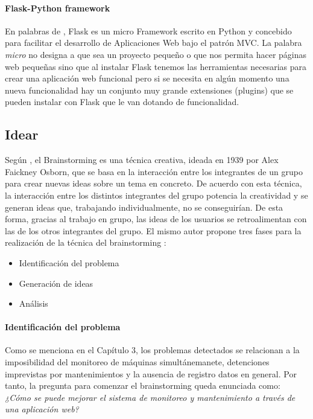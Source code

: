 \paragraph{Flask-Python framework} En palabras de \cite{munoz2017}, Flask es un micro Framework escrito en Python y concebido para facilitar el desarrollo de Aplicaciones Web bajo el patrón MVC. La palabra \textit{micro} no designa a que sea un proyecto pequeño o que nos permita hacer páginas web pequeñas sino que al instalar Flask tenemos las herramientas necesarias para crear una aplicación web funcional pero si se necesita en algún momento una nueva funcionalidad hay un conjunto muy grande extensiones (plugins) que se pueden instalar con Flask que le van dotando de funcionalidad. 

\subsection{Idear}

Según \citep{leis2020}, el Brainstorming es una técnica creativa, ideada en 1939 por Alex Faickney Osborn, que se basa en la interacción entre los integrantes de un grupo para crear nuevas ideas sobre un tema en concreto. De acuerdo con esta técnica, la interacción entre los distintos integrantes del grupo potencia la creatividad y se generan ideas que, trabajando individualmente, no se conseguirían. De esta forma, gracias al trabajo en grupo, las ideas de los usuarios se retroalimentan con las de los otros integrantes del grupo.
El mismo autor propone tres fases para la realización de la técnica del brainstorming \citep{leis2020}:

\begin{itemize}
\item Identificación del problema
\item Generación de ideas
\item Análisis
\end{itemize}

\paragraph{Identificación del problema} Como se menciona en el Capítulo 3, los problemas detectados se relacionan a la imposibilidad del monitoreo de máquinas simultánemanete, detenciones imprevistas por mantenimientos y la ausencia de registro datos en general. Por tanto, la pregunta para comenzar el brainstorming queda enunciada como: \textit{¿Cómo se puede mejorar el sistema de monitoreo y mantenimiento a través de una aplicación web?}


